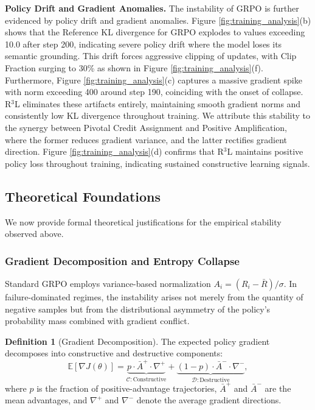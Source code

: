 \documentclass{article} %
\theoremstyle{definition}
\newtheorem{definition}[theorem]{Definition}
\theoremstyle{remark}
\begin{document}
\textbf{Policy Drift and Gradient Anomalies.} The instability of GRPO is further evidenced by policy drift and gradient anomalies. Figure \ref{fig:training_analysis}(b) shows that the Reference KL divergence for GRPO explodes to values exceeding 10.0 after step 200, indicating severe policy drift where the model loses its semantic grounding. This drift forces aggressive clipping of updates, with Clip Fraction surging to 30\% as shown in Figure \ref{fig:training_analysis}(f). Furthermore, Figure \ref{fig:training_analysis}(c) captures a massive gradient spike with norm exceeding 400 around step 190, coinciding with the onset of collapse. R$^3$L eliminates these artifacts entirely, maintaining smooth gradient norms and consistently low KL divergence throughout training. We attribute this stability to the synergy between Pivotal Credit Assignment and Positive Amplification, where the former reduces gradient variance, and the latter rectifies gradient direction. Figure \ref{fig:training_analysis}(d) confirms that R$^3$L maintains positive policy loss throughout training, indicating sustained constructive learning signals.

\subsection{Theoretical Foundations}
\label{sec:theory}
We now provide formal theoretical justifications for the empirical stability observed above.

\subsubsection{Gradient Decomposition and Entropy Collapse}
\label{sec:entropy_collapse}
Standard GRPO employs variance-based normalization $A_i = (R_i - \bar{R})/\sigma$. In failure-dominated regimes, the instability arises not merely from the quantity of negative samples but from the distributional asymmetry of the policy's probability mass combined with gradient conflict.

\begin{definition}[Gradient Decomposition]
The expected policy gradient decomposes into constructive and destructive components:
\begin{equation}
\mathbb{E}[\nabla J(\theta)] = \underbrace{p \cdot \bar{A}^+ \cdot \nabla^+}_{\mathcal{C}: \text{Constructive}} + \underbrace{(1-p) \cdot \bar{A}^- \cdot \nabla^-}_{\mathcal{D}: \text{Destructive}} ,
\end{equation}
where $p$ is the fraction of positive-advantage trajectories, $\bar{A}^+$ and $\bar{A}^-$ are the mean advantages, and $\nabla^+$ and $\nabla^-$ denote the average gradient directions.
\end{definition}
\end{document}
